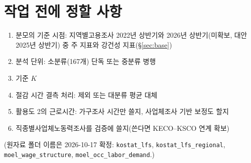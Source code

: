 \documentclass[11pt]{article}
\begin{document}
\section{작업 전에 정할 사항}

\begin{enumerate}[leftmargin=*]
  \item 분모의 기준 시점: 지역별고용조사 2022년 상반기와 2026년 상반기(미확보, 대안 2025년 상반기) 중 주 지표와 강건성 지표(\S\ref{sec:base})
  \item 분석 단위: 소분류(167개) 단독 또는 중분류 병행
  \item 기준 $K$
  \item 절감 시간 결측 처리: 제외 또는 대분류 평균 대체
  \item 활용도 2의 근로시간: 가구조사 시간만 쓸지, 사업체조사 기반 보정도 할지
  \item 직종별사업체노동력조사를 검증에 쓸지(쓴다면 KECO–KSCO 연계 확보)
\end{enumerate}
(원자료 폴더 이름은 2026-10-17 확정: \texttt{kostat\_lfs}, \texttt{kostat\_lfs\_regional}, \texttt{moel\_wage\_structure}, \texttt{moel\_occ\_labor\_demand}.)
\end{document}

